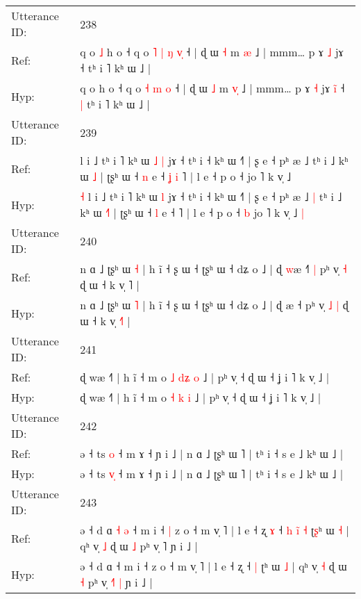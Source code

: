 \documentclass[10pt]{article}
\DeclareRobustCommand{\hl}[1]{{\textcolor{red}{#1}}}
\begin{document}
\begin{longtable}{ll}
 \\
\midrule
Utterance ID: & 238 \\
Ref: & q o\hl{ }\hl{˩} h o ˧ q o\hl{ }\hl{˥} \hl{|} \hl{ŋ} \hl{v}\hl{̩} ˧ | ɖ ɯ \hl{˧} m \hl{}\hl{æ} ˩ | mmm… p ɤ \hl{˩} jɤ\hl{}\hl{}\hl{} ˧\hl{}\hl{} tʰ i ˥ kʰ ɯ ˩ |
 \\
Hyp: & q o\hl{}\hl{} h o ˧ q o\hl{}\hl{} \hl{˧} \hl{m} \hl{}\hl{o} ˧ | ɖ ɯ \hl{˩} m \hl{v}\hl{̩} ˩ | mmm… p ɤ \hl{˧} jɤ\hl{ }\hl{i}\hl{̃} ˧\hl{ }\hl{|} tʰ i ˥ kʰ ɯ ˩ |
 \\
\midrule
Utterance ID: & 239 \\
Ref: & \hl{}\hl{}l i ˩ tʰ i ˥ kʰ ɯ\hl{ }\hl{˩} \hl{|} jɤ ˧ tʰ i ˧ kʰ ɯ ˧˥ | ʂ e ˧ pʰ æ ˩\hl{}\hl{} tʰ i ˩ kʰ ɯ \hl{}\hl{˩} | ʈʂʰ ɯ ˧ \hl{n} e ˧\hl{ }\hl{ʝ}\hl{ }\hl{i} ˥ | l e ˧ p o ˧\hl{}\hl{} jo ˥ k v̩ ˩\hl{}\hl{}
 \\
Hyp: & \hl{˧}\hl{ }l i ˩ tʰ i ˥ kʰ ɯ\hl{}\hl{} \hl{l} jɤ ˧ tʰ i ˧ kʰ ɯ ˧˥ | ʂ e ˧ pʰ æ ˩\hl{ }\hl{|} tʰ i ˩ kʰ ɯ \hl{˧}\hl{˥} | ʈʂʰ ɯ ˧ \hl{l} e ˧\hl{}\hl{}\hl{}\hl{} ˥ | l e ˧ p o ˧\hl{ }\hl{b} jo ˥ k v̩ ˩\hl{ }\hl{|}
 \\
\midrule
Utterance ID: & 240 \\
Ref: & n ɑ ˩ ʈʂʰ ɯ \hl{˧} | h ĩ ˧ ʂ ɯ ˧ ʈʂʰ ɯ ˧ dʑ o ˩ | ɖ \hl{w}æ ˧\hl{˥}\hl{ }\hl{|} pʰ v̩\hl{}\hl{} \hl{˧} ɖ ɯ ˧ k v̩ \hl{}˥ |
 \\
Hyp: & n ɑ ˩ ʈʂʰ ɯ \hl{˥} | h ĩ ˧ ʂ ɯ ˧ ʈʂʰ ɯ ˧ dʑ o ˩ | ɖ \hl{}æ ˧\hl{}\hl{}\hl{} pʰ v̩\hl{ }\hl{˩} \hl{|} ɖ ɯ ˧ k v̩ \hl{˧}˥ |
 \\
\midrule
Utterance ID: & 241 \\
Ref: & ɖ wæ ˧˥ | h ĩ ˧ m o \hl{˩} \hl{d}\hl{ʑ} \hl{o} ˩ | pʰ v̩ ˧ ɖ ɯ ˧ ʝ i ˥ k v̩ ˩ |
 \\
Hyp: & ɖ wæ ˧˥ | h ĩ ˧ m o \hl{˧} \hl{}\hl{k} \hl{i} ˩ | pʰ v̩ ˧ ɖ ɯ ˧ ʝ i ˥ k v̩ ˩ |
 \\
\midrule
Utterance ID: & 242 \\
Ref: & ə ˧ ts \hl{}\hl{o} ˧ m ɤ ˧ ɲ i ˩ | n ɑ ˩ ʈʂʰ ɯ ˥ | tʰ i ˧ s e ˩ kʰ ɯ ˩ |
 \\
Hyp: & ə ˧ ts \hl{v}\hl{̩} ˧ m ɤ ˧ ɲ i ˩ | n ɑ ˩ ʈʂʰ ɯ ˥ | tʰ i ˧ s e ˩ kʰ ɯ ˩ |
 \\
\midrule
Utterance ID: & 243 \\
Ref: & ə ˧ d ɑ\hl{ }\hl{˧}\hl{ }\hl{ə} ˧ m i ˧\hl{ }\hl{|} z o ˧ m v̩ ˥ | l e ˧ ʐ\hl{ }\hl{ɤ} ˧\hl{ }\hl{h}\hl{ }\hl{i}\hl{̃} \hl{˧} ʈ\hl{ʂ}ʰ ɯ \hl{˧} | qʰ v̩ \hl{˩} ɖ ɯ \hl{˩} pʰ v̩ \hl{}˥\hl{}\hl{} ɲ i ˩ |
 \\
Hyp: & ə ˧ d ɑ\hl{}\hl{}\hl{}\hl{} ˧ m i ˧\hl{}\hl{} z o ˧ m v̩ ˥ | l e ˧ ʐ\hl{}\hl{} ˧\hl{}\hl{}\hl{}\hl{}\hl{} \hl{|} ʈ\hl{}ʰ ɯ \hl{˩} | qʰ v̩ \hl{˧} ɖ ɯ \hl{˧} pʰ v̩ \hl{˧}˥\hl{ }\hl{|} ɲ i ˩ |

\end{longtable}
\end{document}
